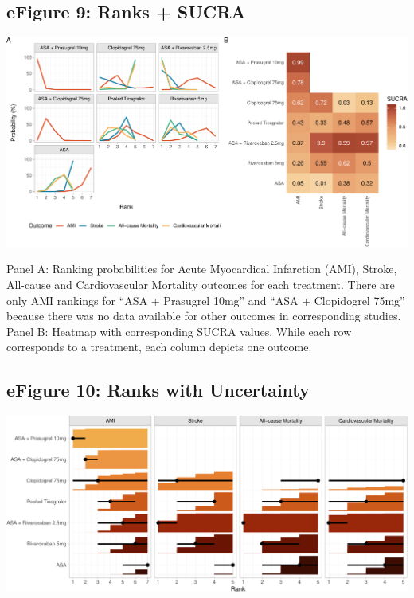 \documentclass[
  12pt,
]{article}
\begin{document}
\begin{landscape}

\hypertarget{efigure-9-ranks-sucra}{%
\subsection{eFigure 9: Ranks + SUCRA}\label{efigure-9-ranks-sucra}}

\begin{center}\includegraphics{03_supplementary_files/figure-latex/unnamed-chunk-52-1} \end{center}

Panel A: Ranking probabilities for Acute Myocardical Infarction (AMI),
Stroke, All-cause and Cardiovascular Mortality outcomes for each
treatment. There are only AMI rankings for ``ASA + Prasugrel 10mg'' and
``ASA + Clopidogrel 75mg'' because there was no data available for other
outcomes in corresponding studies. Panel B: Heatmap with corresponding
SUCRA values. While each row corresponds to a treatment, each column
depicts one outcome.

\end{landscape}

\hypertarget{efigure-10-ranks-with-uncertainty}{%
\subsection{eFigure 10: Ranks with
Uncertainty}\label{efigure-10-ranks-with-uncertainty}}

\begin{center}\includegraphics{03_supplementary_files/figure-latex/unnamed-chunk-53-1} \end{center}
\end{document}
